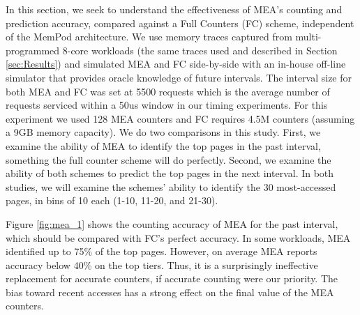 In this section, we seek to understand the effectiveness of MEA's counting 
and prediction accuracy, compared against a Full Counters (FC) scheme,
independent of the MemPod architecture. We use memory traces captured 
from multi-programmed 8-core workloads (the same traces used and described in Section \ref{sec:Results}) and simulated MEA and FC side-by-side with an in-house off-line simulator that provides oracle knowledge of future intervals. 
The interval size for both MEA and FC was set at 5500 requests which is the average number of requests serviced within a 50us window in our timing experiments. For this experiment we used 128 MEA counters and FC requires 4.5M counters (assuming a 9GB memory capacity). 
We do two comparisons in this study.  First, we examine the ability of MEA
to identify the top pages in the past interval, something the full counter
scheme will do perfectly.  Second, we examine the ability of both schemes
to predict the top pages in the next interval.  In both studies, we will
examine the schemes' ability to identify the 30 most-accessed pages, in
bins of 10 each (1-10, 11-20, and 21-30).


Figure \ref{fig:mea_1} shows the counting accuracy of MEA for the 
past interval, which should be compared with FC's perfect accuracy.
In some workloads, MEA identified up to 75\% of the top pages. 
However, on average MEA reports accuracy below 40\% on the top tiers. 
Thus, it is a surprisingly ineffective replacement for accurate counters,
if accurate counting were our priority.  The bias toward recent accesses
has a strong effect on the final value of the MEA counters.



